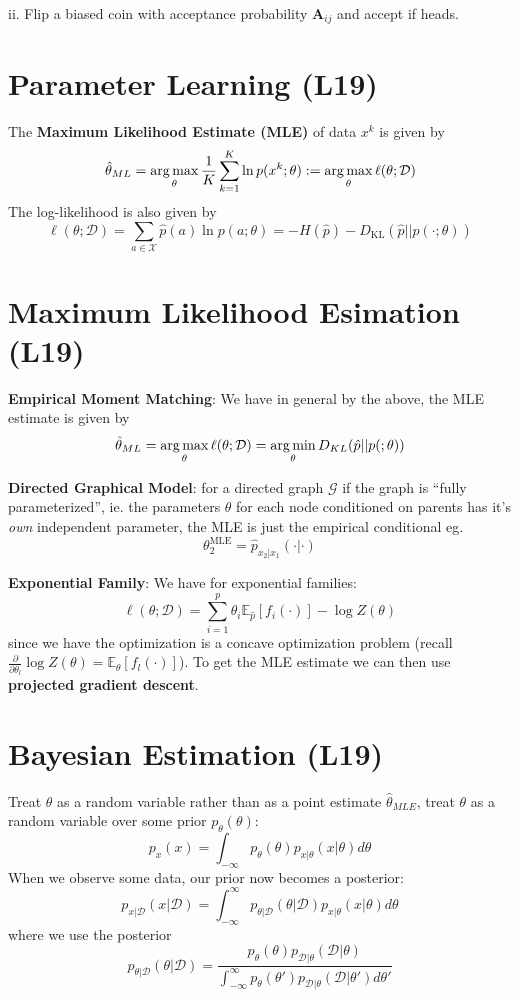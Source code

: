 \documentclass[9pt]{article}
\begin{document}
\begin{multicols}{2}
ii. Flip a biased coin with acceptance probability $\mathbf{A}_{ij}$
and accept if heads.

\section{Parameter Learning (L19)}

The \textbf{Maximum Likelihood Estimate (MLE)} of data $x^{k}$ is given by
$$\hat\theta_{ML}=\operatorname*{arg\,max}_{\theta} \frac{1}{K}\sum_{k=1}^{K}\ln p(x^k;\theta) := \operatorname*{arg\,max}_{\theta}\ell(\theta;\mathcal{D})$$
The log-likelihood is also given by $$\ell(\theta;\mathcal{D})=\sum_{a \in \mathcal{X}}\hat{p}(a)\ln p(a;\theta)=-H(\hat{p})-D_{\text{KL}}(\hat{p} ||
p(\cdot;\theta))$$

\section{Maximum Likelihood Esimation (L19)}

\textbf{Empirical Moment Matching}: We have in general by the above, the MLE estimate is given by
$$\hat\theta_{ML}=\operatorname*{arg\,max}_{\theta}\ell(\theta;\mathcal{D})=\operatorname*{arg\,min}_{\theta}D_{KL}(\hat{p}||p(;\theta))$$

\textbf{Directed Graphical Model}: for a directed graph $\mathcal{G}$ if the
graph is ``fully parameterized'', ie. the parameters $\theta$ for each
node conditioned on parents has it's \textit{own} independent parameter, the
MLE is just the empirical conditional eg. $$\theta_{2}^{\text{MLE}} = \hat p_{x_2|x_1}(\cdot|\cdot)$$

\textbf{Exponential Family}: We have for exponential families: 
$$\ell(\theta;\mathcal{D})=\sum_{i=1}^{p}\theta_i\mathbb{E}_{\hat{p}}[f_i(\cdot)]-\log Z(\theta)$$ since we have the optimization is a
concave optimization problem (recall $\frac{\partial}{\partial \theta_l} \log Z(\theta) = \mathbb{E}_{\theta}[f_l(\cdot)]$). To get
the MLE estimate we can then use \textbf{projected gradient descent}. 

\section{Bayesian Estimation (L19)}
Treat $\theta$ as a random variable rather than as a point 
estimate $\hat\theta_{MLE}$, treat $\theta$ as a random variable
over some prior $p_\theta(\theta)$: 
$$p_{x}(x)=\int_{-\infty}p_{\theta}(\theta)p_{x|\theta}(x|\theta)d\theta$$
When we observe some data, our prior now becomes a posterior:
$$p_{x|\mathcal{D}}(x|\mathcal{D})=\int_{-\infty}^{\infty} 
p_{\theta|\mathcal{D}}(\theta|\mathcal{D})p_{x|\theta}(x|\theta)d\theta$$ where we use the posterior
$$p_{\theta|\mathcal{D}}(\theta|\mathcal{D})=\frac{p_{\theta}(\theta)p_{\mathcal{D}|\theta}(\mathcal{D}|\theta)}{\int_{-\infty}^{\infty}p_{\theta}(\theta')p_{\mathcal{D}|\theta}(\mathcal{D}|\theta')d\theta'}$$


\end{multicols}
\end{document}
